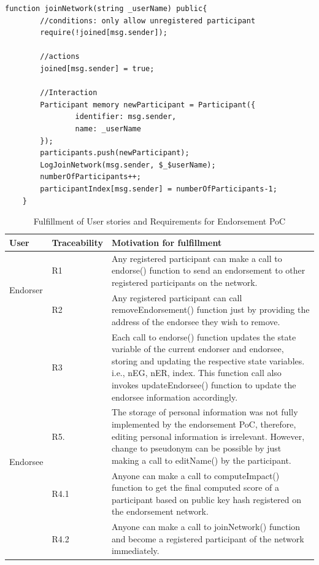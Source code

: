 \begin{lstlisting}[language=Solidity]
	function joinNetwork(string _userName) public{
		//conditions: only allow unregistered participant
		require(!joined[msg.sender]);

		//actions
		joined[msg.sender] = true;
		
        //Interaction
		Participant memory newParticipant = Participant({
				identifier: msg.sender,
				name: _userName
        });
		participants.push(newParticipant);
        LogJoinNetwork(msg.sender, $_$userName);
        numberOfParticipants++;
        participantIndex[msg.sender] = numberOfParticipants-1;
    }
\end{lstlisting}

\begin{center} \label{table:fulfillment} 
	\begin{table}
		\begin{tabular} {| l | l | p{9cm} | }
		\hline
		\textbf{User}  & \textbf{Traceability}   & \textbf{Motivation for fulfillment} \\
		\hline
		\multirow{2}{*}{Endorser} & R1 & Any registered participant can make a
		call to endorse() function to send an endorsement to other registered
		participants on the network.      
		\\\cline{2-3} 
		& R2  & Any registered participant can call removeEndorsement()
		function just by providing the address of the endorsee they wish to
		remove.  \\\cline{2-3}
		& R3 & Each call to endorse() function updates the state variable of
		the current endorser and endorsee, storing and updating the respective
		state variables. i.e., nEG, nER, index. This function call also invokes
		updateEndorsee() function to update the endorsee information
		accordingly.  \\\cline{2-3}
		\hline
		\multirow{2}{*}{Endorsee} & R5.& The storage of personal information
		was not fully implemented by the endorsement PoC, therefore, editing
		personal information is irrelevant. However, change to pseudonym can be
		possible by just making a call to editName() by the participant.
		\\\cline{2-3}
		\hline
		\multirow{2}{*}{other users} & R4.1 & Anyone can make a call to
		computeImpact() function to get the final computed score of a
		participant based on public key hash registered on the endorsement
		network. \\\cline{2-3}
		& R4.2 &  Anyone can make a call to joinNetwork() function and become a
		registered participant of the network immediately.  \\\cline{2-3}
		\hline
	\end{tabular}
	\caption{Fulfillment of User stories and Requirements for Endorsement PoC}
\end{table}
\end{center}

